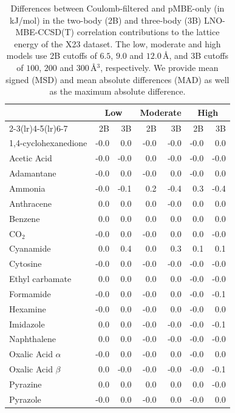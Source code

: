 \begin{table}[h]
\centering

\caption{\label{tab:x23_coulomb_filter_validation}Differences between Coulomb-filtered and pMBE-only (in kJ/mol) in the two-body (2B) and three-body (3B) LNO-MBE-CCSD(T) correlation contributions to the lattice energy of the X23 dataset. The low, moderate and high models use 2B cutoffs of $6.5$, $9.0$ and $12.0\,$\AA{}, and 3B cutoffs of $100$, $200$ and $300\,$\AA{}$^3$, respectively. We provide mean signed (MSD) and mean absolute differences (MAD) as well as the maximum absolute difference.}
\begin{tabular}{lrrrrrr}
\toprule
 & \multicolumn{2}{c}{Low} & \multicolumn{2}{c}{Moderate} & \multicolumn{2}{c}{High} \\ \cmidrule(lr){2-3}\cmidrule(lr){4-5}\cmidrule(lr){6-7}
 & 2B & 3B & 2B & 3B & 2B & 3B \\
\midrule
1,4-cyclohexanedione & -0.0 & 0.0 & -0.0 & -0.0 & -0.0 & 0.0 \\
Acetic Acid & -0.0 & -0.0 & 0.0 & -0.0 & -0.0 & -0.0 \\
Adamantane & -0.0 & 0.0 & -0.0 & 0.0 & -0.0 & 0.0 \\
Ammonia & -0.0 & -0.1 & 0.2 & -0.4 & 0.3 & -0.4 \\
Anthracene & 0.0 & 0.0 & 0.0 & -0.0 & 0.0 & 0.0 \\
Benzene & 0.0 & 0.0 & 0.0 & 0.0 & 0.0 & 0.0 \\
CO$_2$ & -0.0 & 0.0 & -0.0 & 0.0 & 0.0 & -0.0 \\
Cyanamide & 0.0 & 0.4 & 0.0 & 0.3 & 0.1 & 0.1 \\
Cytosine & -0.0 & 0.0 & -0.0 & -0.0 & -0.0 & -0.0 \\
Ethyl carbamate & 0.0 & 0.0 & 0.0 & 0.0 & -0.0 & -0.0 \\
Formamide & -0.0 & 0.0 & -0.0 & 0.0 & -0.0 & -0.1 \\
Hexamine & -0.0 & 0.0 & -0.0 & 0.0 & -0.0 & 0.0 \\
Imidazole & 0.0 & 0.0 & -0.0 & -0.0 & -0.0 & -0.1 \\
Naphthalene & 0.0 & 0.0 & -0.0 & -0.0 & -0.0 & -0.0 \\
Oxalic Acid $\alpha$ & -0.0 & 0.0 & -0.0 & 0.0 & -0.0 & 0.0 \\
Oxalic Acid $\beta$ & 0.0 & -0.0 & -0.0 & -0.0 & -0.0 & -0.1 \\
Pyrazine & 0.0 & 0.0 & 0.0 & 0.0 & 0.0 & -0.0 \\
Pyrazole & -0.0 & 0.0 & -0.0 & 0.0 & -0.0 & 0.0 \\

\end{tabular}
\end{table}

